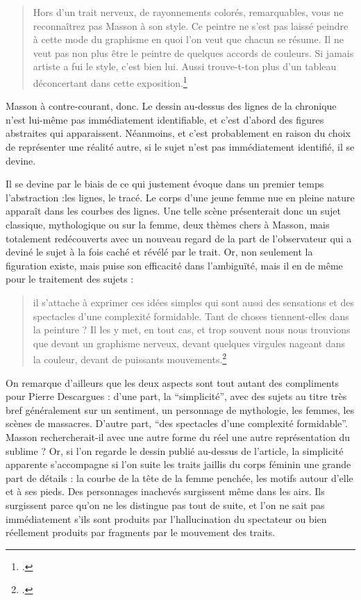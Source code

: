 	\begin{quote}
	 Hors d’un trait nerveux, de rayonnements colorés, remarquables, vous ne reconnaîtrez pas Masson à son style. Ce peintre ne s’est pas laissé peindre à cette mode du graphisme en quoi l’on veut que chacun se résume. Il ne veut pas non plus être le peintre de quelques accords de couleurs. Si jamais artiste a fui le style, c’est bien lui. Aussi trouve-t-ton plus d’un tableau déconcertant dans cette exposition.\footcite{atraversgaleries}\end{quote}
	
	 Masson à contre-courant, donc. Le dessin au-dessus des lignes de la chronique n’est lui-même pas immédiatement identifiable, et c’est d’abord des figures abstraites qui apparaissent. Néanmoins, et c’est probablement en raison du choix de représenter une réalité autre, si le sujet n’est pas immédiatement identifié, il se devine. 

Il se devine par le biais de ce qui justement évoque dans un premier temps l’abstraction :les lignes, le tracé. Le corps d’une jeune femme nue en pleine nature apparaît dans les courbes des lignes. Une telle scène présenterait donc un sujet classique, mythologique ou sur la femme, deux thèmes chers à Masson, mais totalement redécouverts avec un nouveau regard de la part de l’observateur qui a deviné le sujet à la fois caché et révélé par le trait. Or, non seulement la figuration existe, mais puise son efficacité dans l’ambiguïté, mais il en de même pour le traitement des sujets : 

\begin{quote}
il s’attache à exprimer ces idées simples qui sont aussi des sensations et des spectacles d’une complexité formidable. Tant de choses tiennent-elles dans la peinture ? Il les y met, en tout cas, et trop souvent nous nous trouvions que devant un graphisme nerveux, devant quelques virgules nageant dans la couleur, devant de puissants mouvements.\footcite{atraversgaleries}\end{quote}

 
	On remarque d’ailleurs que les deux aspects sont tout autant des compliments pour Pierre Descargues : d’une part, la \enquote{simplicité}, avec des sujets au titre très bref généralement sur un sentiment, un personnage de mythologie, les femmes, les scènes de massacres. D’autre part, \enquote{des spectacles d’une complexité formidable}. Masson rechercherait-il avec une autre forme du réel une autre représentation du sublime ?  Or, si l’on regarde le dessin publié au-dessus de l’article, la simplicité apparente s’accompagne si l’on suite les traits jaillis du corps féminin une grande part de détails : la courbe de la tête de la femme penchée, les motifs autour d’elle et à ses pieds. Des personnages inachevés surgissent même dans les airs. Ils surgissent parce qu’on ne les distingue pas tout de suite, et l’on ne sait pas immédiatement s’ils sont produits par l’hallucination du spectateur ou bien réellement produits par fragments par le mouvement des traits. 

